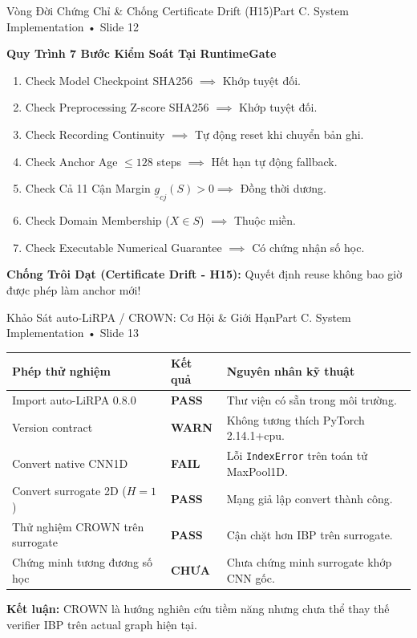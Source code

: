\documentclass[aspectratio=169, 10pt]{beamer}
\begin{document}
\begin{frame}{Vòng Đời Chứng Chỉ \& Chống Certificate Drift (H15)}{Part C. System Implementation • Slide 12}
    \begin{block}{\textbf{Quy Trình 7 Bước Kiểm Soát Tại RuntimeGate}}
        \footnotesize
        \begin{enumerate}
            \item Check Model Checkpoint SHA256 $\implies$ Khớp tuyệt đối.
            \item Check Preprocessing Z-score SHA256 $\implies$ Khớp tuyệt đối.
            \item Check Recording Continuity $\implies$ Tự động reset khi chuyển bản ghi.
            \item Check Anchor Age $\le 128$ steps $\implies$ Hết hạn tự động fallback.
            \item Check Cả 11 Cận Margin $\underline{g}_{cj}(S) > 0 \implies$ Đồng thời dương.
            \item Check Domain Membership ($X \in S$) $\implies$ Thuộc miền.
            \item Check Executable Numerical Guarantee $\implies$ Có chứng nhận số học.
        \end{enumerate}
    \end{block}
    \vspace{0.1cm}
    \alert{\textbf{Chống Trôi Dạt (Certificate Drift - H15):}} Quyết định reuse không bao giờ được phép làm anchor mới!
\end{frame}

\begin{frame}{Khảo Sát auto-LiRPA / CROWN: Cơ Hội \& Giới Hạn}{Part C. System Implementation • Slide 13}
    \small
    \begin{tabular}{llp{5.5cm}}
        \toprule
        \textbf{Phép thử nghiệm} & \textbf{Kết quả} & \textbf{Nguyên nhân kỹ thuật} \\
        \midrule
        Import auto-LiRPA 0.8.0 & \textcolor{MintGreen}{\textbf{PASS}} & Thư viện có sẵn trong môi trường. \\
        Version contract & \textcolor{WarnAmber}{\textbf{WARN}} & Không tương thích PyTorch 2.14.1+cpu. \\
        Convert native CNN1D & \textcolor{AlertRed}{\textbf{FAIL}} & Lỗi \texttt{IndexError} trên toán tử MaxPool1D. \\
        Convert surrogate 2D ($H=1$) & \textcolor{MintGreen}{\textbf{PASS}} & Mạng giả lập convert thành công. \\
        Thử nghiệm CROWN trên surrogate & \textcolor{MintGreen}{\textbf{PASS}} & Cận chặt hơn IBP trên surrogate. \\
        Chứng minh tương đương số học & \textcolor{AlertRed}{\textbf{CHƯA}} & Chưa chứng minh surrogate khớp CNN gốc. \\
        \bottomrule
    \end{tabular}
    \vspace{0.3cm}
    \footnotesize
    \textbf{Kết luận:} CROWN là hướng nghiên cứu tiềm năng nhưng chưa thể thay thế verifier IBP trên actual graph hiện tại.
\end{frame}
\end{document}
